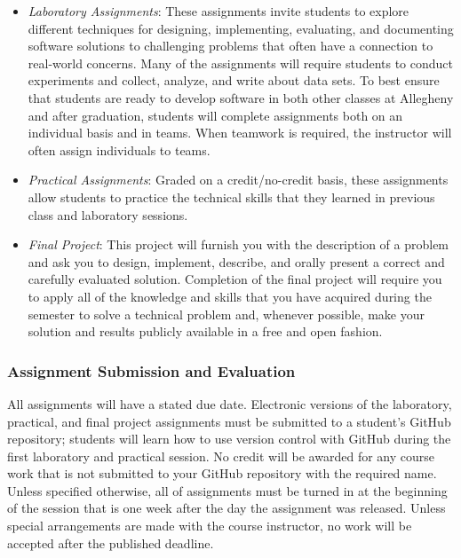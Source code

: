 \documentclass[11pt]{article}
\begin{document}
\begin{itemize}
  \item {\em Laboratory Assignments\/}: These assignments invite students to explore different techniques for designing,
    implementing, evaluating, and documenting software solutions to challenging problems that often have a connection to
    real-world concerns. Many of the assignments will require students to conduct experiments and collect, analyze, and
    write about data sets. To best ensure that students are ready to develop software in both other classes at Allegheny
    and after graduation, students will complete assignments both on an individual basis and in teams. When teamwork is
    required, the instructor will often assign individuals to teams.

  \item {\em Practical Assignments\/}: Graded on a credit/no-credit basis, these assignments allow students to practice
    the technical skills that they learned in previous class and laboratory sessions.

  \item {\em Final Project\/}: This project will furnish you with the description of a problem and ask you to design,
    implement, describe, and orally present a correct and carefully evaluated solution. Completion of the final project
    will require you to apply all of the knowledge and skills that you have acquired during the semester to solve a
    technical problem and, whenever possible, make your solution and results publicly available in a free and open
    fashion.

\end{itemize}

\subsubsection*{Assignment Submission and Evaluation}

All assignments will have a stated due date. Electronic versions of the laboratory, practical, and final project
assignments must be submitted to a student's GitHub repository; students will learn how to use version control with
GitHub during the first laboratory and practical session. No credit will be awarded for any course work that is not
submitted to your GitHub repository with the required name. Unless specified otherwise, all of assignments must be
turned in at the beginning of the session that is one week after the day the assignment was released. Unless special
arrangements are made with the course instructor, no work will be accepted after the published deadline.
\end{document}
